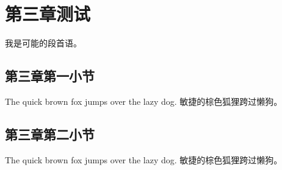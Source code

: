 \chapter{第三章测试}
\label{chap:tertiary}

我是可能的段首语。

\section{第三章第一小节}
\label{sec:tertiary:1}

The quick brown fox jumps over the lazy dog. 敏捷的棕色狐狸跨过懒狗。

\section{第三章第二小节}
\label{sec:tertiary:2}

The quick brown fox jumps over the lazy dog. 敏捷的棕色狐狸跨过懒狗。
